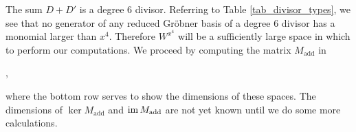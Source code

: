 The sum $D + D'$ is a degree 6 divisor. Referring to Table \ref{tab_divisor_types},
we see that no generator of any reduced Gr\"obner basis of a degree 6 divisor has a monomial larger than $x^4$.
Therefore $W^{x^4}$ will be a sufficiently large space in which to perform our computations.
We proceed by computing the matrix $M_{\text{add}}$ in
\begin{center}
  ,
\end{center}
where the bottom row serves to show the dimensions of these spaces.
The dimensions of $\ker M_{\text{add}}$ and $\operatorname{im} M_{\text{add}}$ are not yet known until we do some more calculations.

